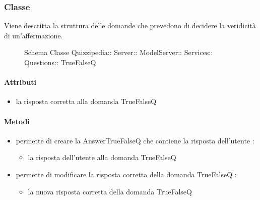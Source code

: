 \subsubsection{Classe }
Viene descritta la struttura delle domande che prevedono di decidere la veridicità di un'affermazione.
\begin{figure}[H]
\centering
\noindent{}
\caption[Schema Classe TrueFalseQ]{Schema Classe Quizzipedia:: Server:: ModelServer:: Services:: Questions:: TrueFalseQ}
\end{figure}
\paragraph{Attributi}
\begin{itemize}
\item {}
\newline
la risposta corretta alla domanda TrueFalseQ
\end{itemize}
\paragraph{Metodi}
\begin{itemize}
\item {}
\newline
permette di creare la AnswerTrueFalseQ che contiene la risposta dell'utente
\newline
{} :
\begin{itemize}
\item {}
\newline
la risposta dell'utente alla domanda TrueFalseQ
\end{itemize}
\item {}
\newline
permette di modificare la risposta corretta della domanda TrueFalseQ
\newline
{} :
\begin{itemize}
\item {}
\newline
la nuova risposta corretta della domanda TrueFalseQ
\end{itemize}
\end{itemize}
